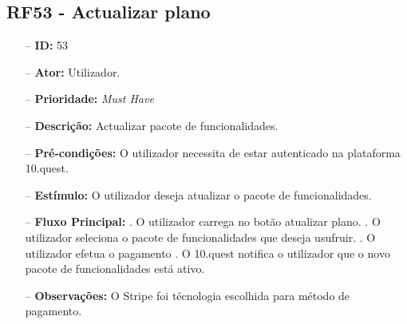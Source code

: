 \subsection{RF53 - Actualizar plano}
\begin{itemize}
	\item[--] \textbf{ID:} 53
	\item[--]  \textbf{Ator:} Utilizador.
	\item[--]  \textbf{Prioridade:} \textit{Must Have}
	\item[--]  \textbf{Descrição:} Actualizar pacote de funcionalidades.
	\item[--]  \textbf{Pré-condições:} O utilizador necessita de estar autenticado na plataforma 10.quest.
	\item[--]  \textbf{Estímulo:} O utilizador deseja atualizar o pacote de funcionalidades.
	\item[--]  \textbf{Fluxo Principal:} 
	. O utilizador carrega no botão atualizar plano.
	. O utilizador seleciona o pacote de funcionalidades que deseja usufruir.
	. O utilizador efetua o pagamento
	. O 10.quest notifica o utilizador que o novo pacote de funcionalidades está ativo.
	\item[--]  \textbf{Observações:} O Stripe foi técnologia escolhida para método de pagamento.
\end{itemize}
\newpage

